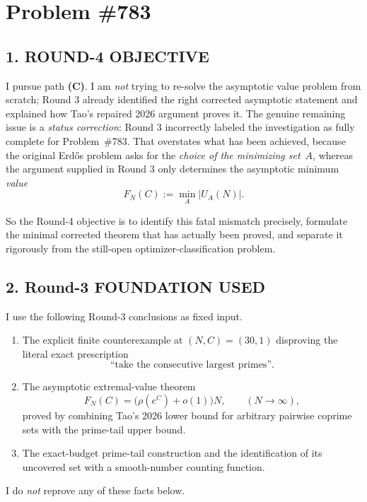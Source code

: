 \section{Problem \#783}

\subsection*{1. ROUND-4 OBJECTIVE}

I pursue path \textbf{(C)}.  I am \emph{not} trying to re-solve the asymptotic value problem from scratch; Round 3 already identified the right corrected asymptotic statement and explained how Tao's repaired 2026 argument proves it.  The genuine remaining issue is a \emph{status correction}: Round 3 incorrectly labeled the investigation as fully complete for Problem~\#783.  That overstates what has been achieved, because the original Erd\H{o}s problem asks for the \emph{choice of the minimizing set}~$A$, whereas the argument supplied in Round 3 only determines the asymptotic minimum \emph{value}
\[
F_N(C):=\min_A |U_A(N)|.
\]

So the Round-4 objective is to identify this fatal mismatch precisely, formulate the minimal corrected theorem that has actually been proved, and separate it rigorously from the still-open optimizer-classification problem.

\subsection*{2. Round-3 FOUNDATION USED}

I use the following Round-3 conclusions as fixed input.

\begin{enumerate}
	\item The explicit finite counterexample at $(N,C)=(30,1)$ disproving the literal exact prescription
	\[
	\text{``take the consecutive largest primes''.}
	\]
	\item The asymptotic extremal-value theorem
	\[
	F_N(C)=\bigl(\rho(e^C)+o(1)\bigr)N,
	\qquad (N\to\infty),
	\]
	proved by combining Tao's 2026 lower bound for arbitrary pairwise coprime sets with the prime-tail upper bound.
	\item The exact-budget prime-tail construction and the identification of its uncovered set with a smooth-number counting function.
\end{enumerate}

I do \emph{not} reprove any of these facts below.

